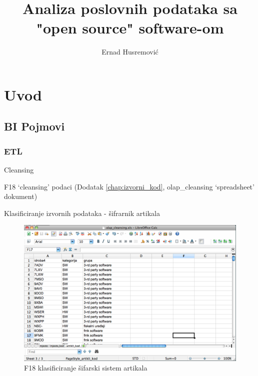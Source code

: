 \documentclass[times, utf8, seminar]{fit}
\begin{document}
\title{Analiza poslovnih podataka sa "open source" software-om}

\author{Ernad Husremović}


\maketitle

\tableofcontents

\chapter{Uvod}

\section{BI Pojmovi}

\subsection{ETL}

Cleansing

F18 `cleansing' podaci  (Dodatak \ref{chap:izvorni_kod}, olap\_cleansing `spreadsheet' dokument)

Klasificiranje izvornih podataka - šifrarnik artikala

\begin{figure}[H]
\centering
\includegraphics[width=15cm]{img/clean_artikli.png}
\caption{F18 klasificiranje šifarski sistem artikala}
\end{figure}
\end{document}
